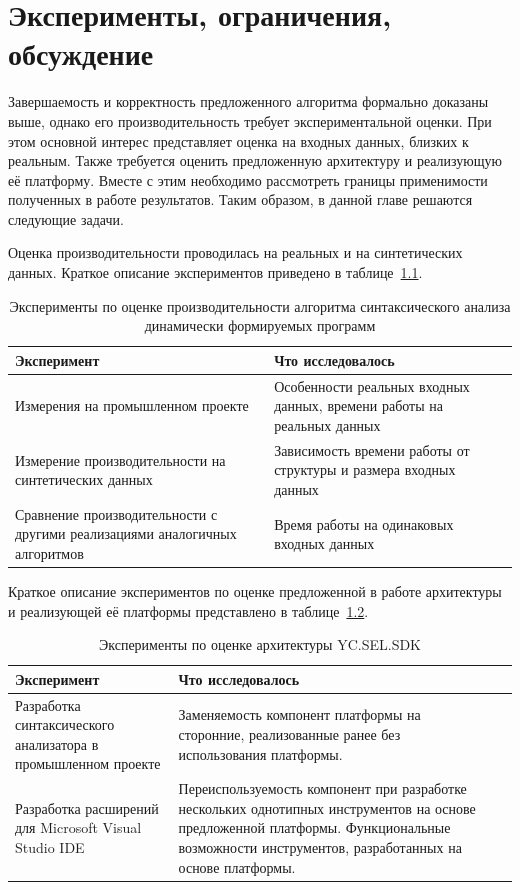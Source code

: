 \chapter{Эксперименты, ограничения, обсуждение} \label{chaptEval}

Завершаемость и корректность предложенного алгоритма формально доказаны выше, однако его производительность требует экспериментальной оценки. При этом основной интерес представляет оценка на входных данных, близких к реальным. Также требуется оценить предложенную архитектуру и реализующую её платформу. Вместе с этим необходимо рассмотреть границы применимости полученных в работе результатов. Таким образом, в данной главе решаются следующие задачи.

Оценка производительности проводилась на реальных и на синтетических данных. Краткое описание экспериментов приведено в таблице~\ref{tbl:PerfEval}.

\begin{table} [H]
  \centering
  \parbox{15cm}{\caption{Эксперименты по оценке производительности алгоритма синтаксического анализа динамически формируемых программ}\label{tbl:PerfEval}}
  \begin{tabular}{| p{6cm} | p{9cm}l |}
  \hline                               
  \hline
  Эксперимент & Что исследовалось & \\
  \hline
  \hline 
  Измерения на промышленном проекте                         & Особенности реальных входных данных, времени работы на реальных данных & \\
  \hline
  Измерение производительности на синтетических данных                         & Зависимость времени работы от структуры и размера входных данных & \\
  \hline
  Сравнение производительности с другими реализациями аналогичных алгоритмов   & Время работы на одинаковых входных данных &  \\
  \hline
  \hline
  \end{tabular}
\end{table}

Краткое описание экспериментов по оценке предложенной в работе архитектуры и реализующей её платформы представлено в таблице~\ref{tbl:ArchEval}.

\begin{table} [htbp]
  \centering
  \parbox{15cm}{\caption{Эксперименты по оценке архитектуры YC.SEL.SDK}\label{tbl:ArchEval}}
  \begin{tabular}{| p{6cm} | p{9cm}l |}
  \hline                               
  \hline
  Эксперимент & Что исследовалось & \\
  \hline 
  \hline
  Разработка синтаксического анализатора в промышленном проекте & Заменяемость компонент платформы на сторонние, реализованные ранее без использования платформы. & \\
    \hline
  Разработка расширений для Microsoft Visual Studio IDE         & Переиспользуемость компонент при разработке нескольких однотипных инструментов на основе предложенной платформы. Функциональные возможности инструментов, разработанных на основе платформы. & \\
  \hline
  \hline
  \end{tabular}
\end{table}

